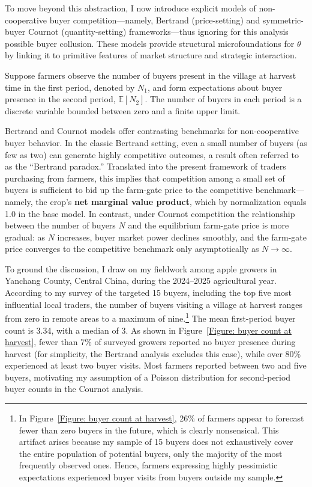 To move beyond this abstraction, I now introduce explicit models of non-cooperative buyer competition---namely, Bertrand (price-setting) and symmetric-buyer Cournot (quantity-setting) frameworks---thus ignoring for this analysis possible buyer collusion. These models provide structural microfoundations for $\theta$ by linking it to primitive features of market structure and strategic interaction.


Suppose farmers observe the number of buyers present in the village at harvest time in the first period, denoted by $N_1$, and form expectations about buyer presence in the second period, $\mathbb{E}[N_2]$. The number of buyers in each period is a discrete variable bounded between zero and a finite upper limit.

Bertrand and Cournot models offer contrasting benchmarks for non-cooperative buyer behavior. In the classic Bertrand setting, even a small number of buyers (as few as two) can generate highly competitive outcomes, a result often referred to as the ``Bertrand paradox.'' Translated into the present framework of traders purchasing from farmers, this implies that competition among a small set of buyers is sufficient to bid up the farm-gate price to the competitive benchmark---namely, the crop's \textbf{net marginal value product}, which by normalization equals 1.0 in the base model. In contrast, under Cournot competition the relationship between the number of buyers $N$ and the equilibrium farm-gate price is more gradual: as $N$ increases, buyer market power declines smoothly, and the farm-gate price converges to the competitive benchmark only asymptotically as $N \to \infty$.


To ground the discussion, I draw on my fieldwork among apple growers in Yanchang County, Central China, during the 2024–2025 agricultural year. According to my survey of the targeted 15 buyers, including the top five most influential local traders, the number of buyers visiting a village at harvest ranges from zero in remote areas to a maximum of nine.\footnote{In Figure~\ref{Figure: buyer count at harvest}, 26\% of farmers appear to forecast fewer than zero buyers in the future, which is clearly nonsensical. This artifact arises because my sample of 15 buyers does not exhaustively cover the entire population of potential buyers, only the majority of the most frequently observed ones. Hence, farmers expressing highly pessimistic expectations experienced buyer visits from buyers outside my sample.} The mean first-period buyer count is 3.34, with a median of 3. As shown in Figure~\ref{Figure: buyer count at harvest}, fewer than 7\% of surveyed growers reported no buyer presence during harvest (for simplicity, the Bertrand analysis excludes this case), while over 80\% experienced at least two buyer visits. Most farmers reported between two and five buyers, motivating my assumption of a Poisson distribution for second-period buyer counts in the Cournot analysis.

